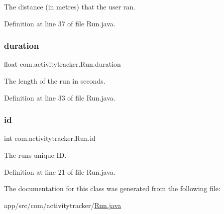 The distance (in metres) that the user ran. 

Definition at line 37 of file Run.\+java.

\mbox{\label{classcom_1_1activitytracker_1_1_run_a5e38d293d29d4b65c9290ff4bee82e03}} 
\subsubsection{\texorpdfstring{duration}{duration}}
{\footnotesize\ttfamily float com.\+activitytracker.\+Run.\+duration\hspace{0.3cm}{\ttfamily [package]}}

The length of the run in seconds. 

Definition at line 33 of file Run.\+java.

\mbox{\label{classcom_1_1activitytracker_1_1_run_aa76717aee690b5bfe919d6e87dea1d84}} 
\subsubsection{\texorpdfstring{id}{id}}
{\footnotesize\ttfamily int com.\+activitytracker.\+Run.\+id\hspace{0.3cm}{\ttfamily [package]}}

The run\textquotesingle{}s unique ID. 

Definition at line 21 of file Run.\+java.



The documentation for this class was generated from the following file\+:\begin{DoxyCompactItemize}
\item 
app/src/com/activitytracker/\mbox{\hyperlink{_run_8java}{Run.\+java}}\end{DoxyCompactItemize}
